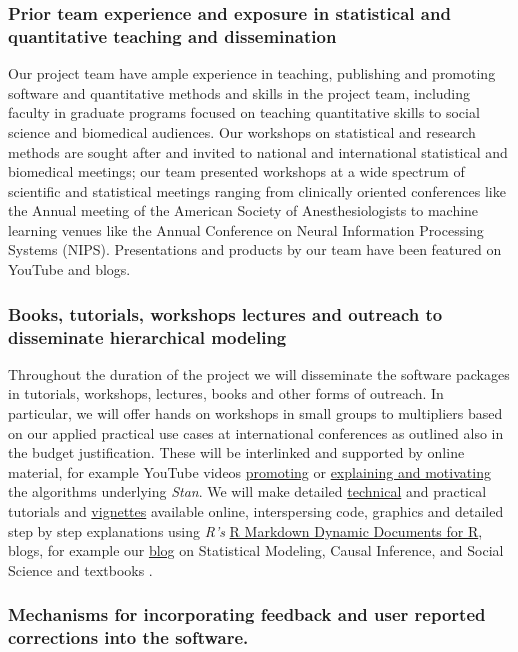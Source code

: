 \documentclass[11pt,notitlepage]{article}
\begin{document}
\subsubsection*{Prior team experience and exposure in statistical and quantitative teaching and dissemination}
Our project team have ample experience in teaching, publishing and promoting software and quantitative methods and skills in the project 
team, including faculty in graduate programs focused on teaching quantitative skills to social science and biomedical audiences. 
Our workshops on statistical and research methods are sought after and invited to national and international statistical and biomedical 
meetings; our team presented workshops at a wide spectrum of scientific and statistical meetings ranging from clinically oriented 
conferences like the Annual meeting of the American Society of Anesthesiologists to machine learning venues like the Annual Conference 
on Neural Information Processing Systems (NIPS). Presentations  and products by our team have been featured on YouTube and blogs.   

\subsubsection*{Books, tutorials, workshops lectures and outreach to disseminate hierarchical modeling}
Throughout the duration of the project we will disseminate the software packages in tutorials, workshops, lectures, books and other forms 
of outreach. In particular, we will offer hands on workshops in small groups to multipliers based on our applied practical use cases at 
international conferences as outlined also in the budget justification. These will be interlinked and supported by online material, for 
example YouTube videos \href{https://www.youtube.com/watch?v=pWow8Qe1snQ}{promoting} or 
\href{https://www.youtube.com/watch?v=pHsuIaPbNbY}{explaining and motivating} the algorithms underlying \textit{Stan}. We will make 
detailed \href{http://mc-stan.org/documentation/}{technical} and practical tutorials and 
\href{https://cran.r-project.org/web/packages/rstanarm/vignettes/aov.html}{vignettes} available online, interspersing code, graphics 
and detailed step by step explanations using \textit{R's}  \href{http://rmarkdown.rstudio.com/}{R Markdown \- Dynamic Documents for R}, 
blogs, for example our \href{http://andrewgelman.com/}{blog} on Statistical Modeling, Causal Inference, and Social Science and 
textbooks \cite{Gelman-Hill_2014}. 

\subsubsection*{Mechanisms for incorporating feedback and user reported corrections into the software.}
\end{document}
